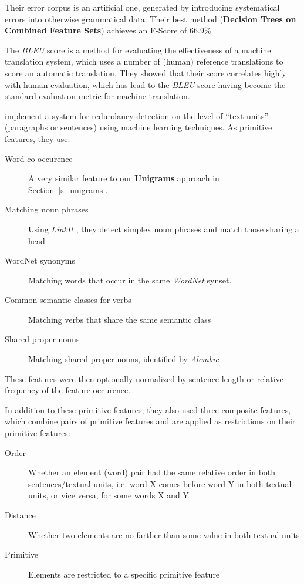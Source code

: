 \documentclass[a4paper,10pt]{scrartcl}
\theoremstyle{style}
\begin{document}
Their error corpus is an artificial one, generated by introducing systematical errors into otherwise grammatical data. Their best method (\textbf{Decision Trees on Combined Feature Sets}) achieves an F-Score of 66.9\%.

The \textit{BLEU} score \citep{papineni2002bleu} is a method for evaluating the effectiveness of a machine translation system, which uses a number of (human) reference translations to score an automatic translation. They showed that their score correlates highly with human evaluation, which has lead to the \textit{BLEU} score having become the standard evaluation metric for machine translation.

\cite{hatzivassiloglou1999detecting} implement a system for redundancy detection on the level of ``text units'' (paragraphs or sentences) using machine learning techniques. As primitive features, they use:

\begin{description}
	\item[Word co-occurence] A very similar feature to our \textbf{Unigrams} approach in Section~\ref{s_unigrams}.
	\item[Matching noun phrases] Using \textit{LinkIt} \citep{wacholder1998simplex}, they detect simplex noun phrases and match those sharing a head
	\item[WordNet synonyms] Matching words that occur in the same \textit{WordNet} \citep{fellbaum2005wordnet} synset.
	\item[Common semantic classes for verbs] Matching verbs that share the same semantic class \citep{levin1993english}
	\item[Shared proper nouns] Matching shared proper nouns, identified by \textit{Alembic} \citep{aberdeen1995mitre}
\end{description}

These features were then optionally normalized by sentence length or relative frequency of the feature occurence.

In addition to these primitive features, they also used three composite features, which combine pairs of primitive features and are applied as restrictions on their primitive features:

\begin{description}
	\item[Order] Whether an element (word) pair had the same relative order in both sentences/textual units, i.e. word X comes before word Y in both textual units, or vice versa, for some words X and Y
	\item[Distance] Whether two elements are no farther than some value in both textual units
	\item[Primitive] Elements are restricted to a specific primitive feature
\end{description}
\end{document}
